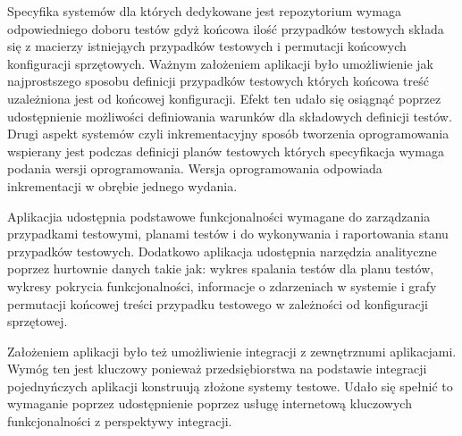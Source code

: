 Specyfika systemów dla których dedykowane jest repozytorium wymaga odpowiedniego doboru testów gdyż końcowa ilość przypadków testowych składa się z macierzy istniejąych przypadków testowych i permutacji końcowych konfiguracji sprzętowych. Ważnym założeniem aplikacji było umożliwienie jak najprostszego sposobu definicji przypadków testowych których końcowa treść uzależniona jest od końcowej konfiguracji. Efekt ten udało się osiągnąć poprzez udostępnienie możliwości definiowania warunków dla składowych definicji testów. Drugi aspekt systemów czyli inkrementacyjny sposób tworzenia oprogramowania wspierany jest podczas definicji planów testowych których specyfikacja wymaga podania wersji oprogramowania. Wersja oprogramowania odpowiada inkrementacji w obrębie jednego wydania.

Aplikacjia udostępnia podstawowe funkcjonalności wymagane do zarządzania przypadkami testowymi, planami testów  i do  wykonywania i raportowania stanu przypadków testowych. Dodatkowo aplikacja udostępnia narzędzia analityczne poprzez hurtownie danych takie jak: wykres spalania testów dla planu testów, wykresy pokrycia funkcjonalności, informacje o zdarzeniach w systemie i grafy permutacji końcowej treści przypadku testowego w zależności od konfiguracji sprzętowej.

Założeniem aplikacji było też umożliwienie integracji z zewnętrznumi aplikacjami. Wymóg ten jest kluczowy ponieważ przedsiębiorstwa na podstawie integracji pojednyńczych aplikacji konstruują złożone systemy testowe. Udało się spełnić to wymaganie poprzez udostępnienie poprzez usługę internetową kluczowych funkcjonalności z perspektywy integracji.

 
